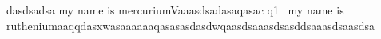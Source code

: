 dasdsadsa
my name is mercuriumVaaasdsadasaqasac 	q1~
my name is rutheniumaaqqdasxwasaaaaaaqasasasdasdwqaasdsaaasdsasddsaaasdsaasdsa